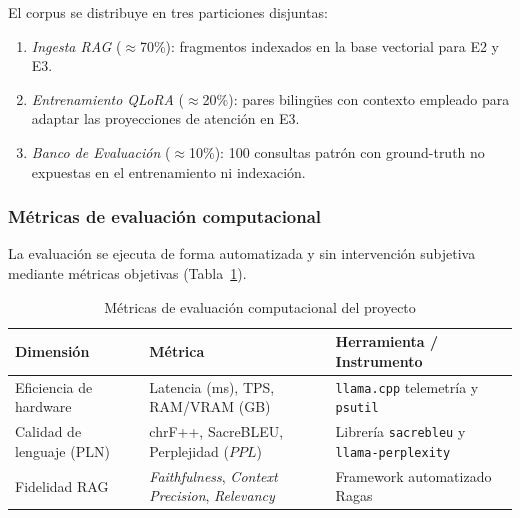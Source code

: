 El corpus se distribuye en tres particiones disjuntas:
\begin{enumerate}
    \item \textit{Ingesta RAG} ($\approx$70\%): fragmentos indexados en la base vectorial para E2 y E3.
    \item \textit{Entrenamiento QLoRA} ($\approx$20\%): pares bilingües con contexto empleado para adaptar las proyecciones de atención en E3.
    \item \textit{Banco de Evaluación} ($\approx$10\%): 100 consultas patrón con ground-truth no expuestas en el entrenamiento ni indexación.
\end{enumerate}

\subsubsection{Métricas de evaluación computacional}

La evaluación se ejecuta de forma automatizada y sin intervención subjetiva mediante métricas objetivas (Tabla~\ref{tab:metricas}).

\begin{table}[H]
\centering
\caption{Métricas de evaluación computacional del proyecto}
\label{tab:metricas}
\small
\begin{tabular}{@{}p{3.5cm}p{4.5cm}p{5.5cm}@{}}
\toprule
\textbf{Dimensión} & \textbf{Métrica} & \textbf{Herramienta / Instrumento} \\
\midrule
Eficiencia de hardware & Latencia (ms), TPS, RAM/VRAM (GB) & \texttt{llama.cpp} telemetría y \texttt{psutil} \\
\midrule
Calidad de lenguaje (PLN) & chrF++, SacreBLEU, Perplejidad ($PPL$) & Librería \texttt{sacrebleu} y \texttt{llama-perplexity} \\
\midrule
Fidelidad RAG & \textit{Faithfulness}, \textit{Context Precision}, \textit{Relevancy} & Framework automatizado Ragas \citep{Ragas2024} \\
\bottomrule
\end{tabular}
\end{table}

